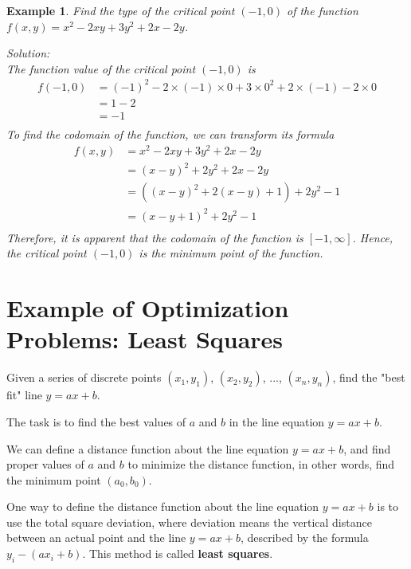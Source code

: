 \documentclass{article}
\newtheorem{example}{Example}
\begin{document}
\begin{example}
  Find the type of the critical point $(-1, 0)$ of the function 
  $f(x, y) = x^2 - 2xy + 3y^2 + 2x - 2y$.

  Solution: \\
  The function value of the critical point $(-1, 0)$ is 
  \begin{equation*}
    \begin{split}
      f(-1, 0) &= (-1)^2 - 2 \times (-1) \times 0 + 3 \times 0^2 + 2 \times (-1) - 2 \times 0 \\
               &= 1 - 2 \\
               &= -1 \\
    \end{split}
  \end{equation*}
  To find the codomain of the function, we can transform its formula
  \begin{equation*}
    \begin{split}
      f(x, y) &= x^2 - 2xy + 3y^2 + 2x - 2y \\
              &= (x - y)^2 + 2y^2 + 2x - 2y \\
              &= ((x - y)^2 + 2(x - y) + 1) + 2y^2 - 1 \\
              &= (x - y + 1)^2 + 2y^2 - 1 \\
    \end{split}
  \end{equation*}
  Therefore, it is apparent that the codomain of the function is $[-1, \infty]$. 
  Hence, the critical point $(-1, 0)$ is the minimum point of the function.
\end{example}

\section{Example of Optimization Problems: Least Squares}

Given a series of discrete points $(x_1, y_1)$, $(x_2, y_2)$, ..., $(x_n, y_n)$, 
find the "best fit" line $y = ax + b$.

The task is to find the best values of $a$ and $b$ in the line equation 
$y = ax + b$.

We can define a distance function about the line equation $y = ax + b$, and find 
proper values of $a$ and $b$ to minimize the distance function, in other words, 
find the minimum point $(a_0, b_0)$.

\bigskip

One way to define the distance function about the line equation $y = ax + b$ is 
to use the total square deviation, where deviation means the vertical distance 
between an actual point and the line $y = ax + b$, described by the formula 
$y_i - (ax_i + b)$. This method is called \textbf{least squares}.
\end{document}
